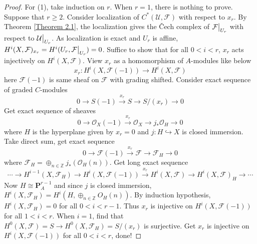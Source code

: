 \documentclass{ctexart}
\begin{document}
\begin{proof}
    \par
    For (1), take induction on $r$.
    When $r = 1$, there is nothing to prove.
    Suppose that $r \ge 2$.
    Consider localization of $C^{\ast}(\mathcal{U}, \mathcal{F})$ with respect to $x_{r}$.
    By Theorem \ref{Theorem 2.1}, the localization gives the Čech complex of $\mathcal{F}\big{|}_{U_{r}}$ with respect to $\mathcal{U}\big{|}_{U_{r}}$.
    As localization is exact and $U_{r}$ is affine, $H^{i}(X, \mathcal{F})_{x_{r}} = H^{i}(U_{r}, \mathcal{F}\big{|}_{U_{r}}) = 0$.
    Suffice to show that for all $0 < i < r$, $x_{r}$ acts injectively on $H^{i}(X, \mathcal{F})$.
    View $x_{r}$ as a homomorphism of $A$-modules like below
    \begin{equation*}
        x_{r}: H^{i}(X, \mathcal{F}(-1)) \longrightarrow H^{i}(X, \mathcal{F})
    \end{equation*}
    here $\mathcal{F}(-1)$ is same sheaf on $\mathcal{F}$ with grading shifted.
    Consider exact sequence of graded $C$-modules 
    \begin{equation*}
        0 \longrightarrow S(-1) \overset{x_{r}}{\longrightarrow} S \longrightarrow S/(x_{r}) \longrightarrow 0
    \end{equation*}
    Get exact sequence of sheaves 
    \begin{equation*}
        0 \longrightarrow \mathcal{O}_{X}(-1) \overset{x_{r}}{\longrightarrow} \mathcal{O}_{X} \longrightarrow j_{\ast}\mathcal{O}_{H} \longrightarrow 0
    \end{equation*}
    where $H$ is the hyperplane given by $x_{r} = 0$ and $j: H \hookrightarrow X$ is closed immersion. 
    Take direct sum, get exact sequence
    \begin{equation*}
        0 \longrightarrow \mathcal{F}(-1) \overset{x_{r}}{\longrightarrow} \mathcal{F} \longrightarrow \mathcal{F}_{H} \longrightarrow 0
    \end{equation*}
    where $\mathcal{F}_{H} = \oplus_{n\in \mathbb{Z}} j_{\ast}(\mathcal{O}_{H}(n))$. 
    Get long exact sequence
    \begin{equation*}
        \cdots \longrightarrow H^{i - 1}(X, \mathcal{F}_{H}) \longrightarrow H^{i}(X, \mathcal{F}(-1)) \overset{x_{r}}{\longrightarrow} H^{i}(X, \mathcal{F}) \longrightarrow H^{i}(X, \mathcal{F})_{H} \longrightarrow \cdots
    \end{equation*}
    Now $H \cong \mathbf{P}^{r - 1}_{A}$ and since $j$ is closed immersion, $H^{i}(X, \mathcal{F}_{H}) = H^{i}(H, \oplus_{n\in \mathbb{Z}} O_{H}(n))$.
    By induction hypothesis, $H^{i}(X, \mathcal{F}_{H}) = 0$ for all $0 < i < r - 1$.
    Thus $x_{r}$ is injective on $H^{i}(X, \mathcal{F}(-1))$ for all $1 < i < r$.
    When $i = 1$, find that $H^{0}(X, \mathcal{F}) = S \longrightarrow H^{0}(X, \mathcal{F}_{H}) = S/(x_{r})$ is surjective.
    Get $x_{r}$ is injective on $H^{i}(X, \mathcal{F}(-1))$ for all $0 < i < r$, done!
\end{proof}
\end{document}

